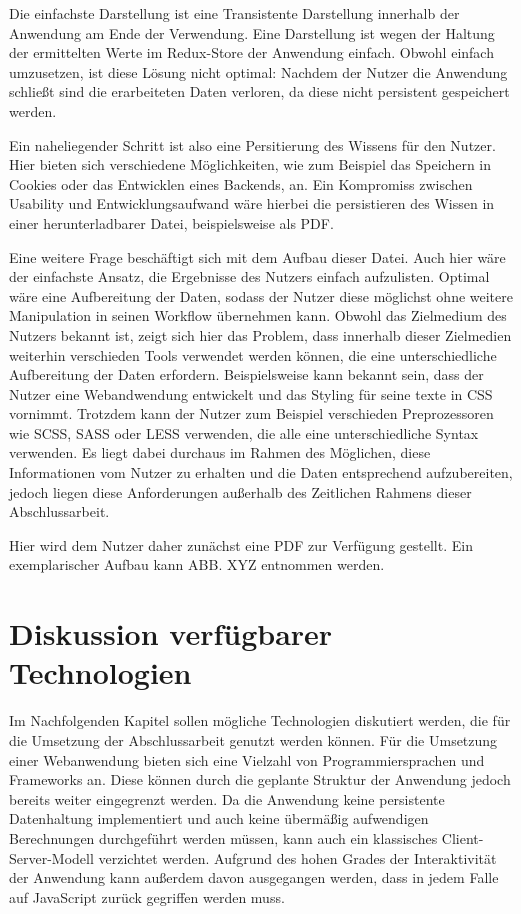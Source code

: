 Die einfachste Darstellung ist eine Transistente Darstellung innerhalb der Anwendung am Ende der Verwendung. Eine Darstellung ist wegen der Haltung der ermittelten Werte im Redux-Store der Anwendung einfach. Obwohl einfach umzusetzen, ist diese Lösung nicht optimal: Nachdem der Nutzer die Anwendung schließt sind die erarbeiteten Daten verloren, da diese nicht persistent gespeichert werden.

Ein naheliegender Schritt ist also eine Persitierung des Wissens für den Nutzer. Hier bieten sich verschiedene Möglichkeiten, wie zum Beispiel das Speichern in Cookies oder das Entwicklen eines Backends, an. Ein Kompromiss zwischen Usability und Entwicklungsaufwand wäre hierbei die persistieren des Wissen in einer herunterladbarer Datei, beispielsweise als PDF.

Eine weitere Frage beschäftigt sich mit dem Aufbau dieser Datei. Auch hier wäre der einfachste Ansatz, die Ergebnisse des Nutzers einfach aufzulisten. Optimal wäre eine Aufbereitung der Daten, sodass der Nutzer diese möglichst ohne weitere Manipulation in seinen Workflow übernehmen kann. Obwohl das Zielmedium des Nutzers bekannt ist, zeigt sich hier das Problem, dass innerhalb dieser Zielmedien weiterhin verschieden Tools verwendet werden können, die eine unterschiedliche Aufbereitung der Daten erfordern.
Beispielsweise kann bekannt sein, dass der Nutzer eine Webandwendung entwickelt und das Styling für seine texte in CSS vornimmt. Trotzdem kann der Nutzer zum Beispiel verschieden Preprozessoren wie SCSS, SASS oder LESS verwenden, die alle eine unterschiedliche Syntax verwenden.
Es liegt dabei durchaus im Rahmen des Möglichen, diese Informationen vom Nutzer zu erhalten und die Daten entsprechend aufzubereiten, jedoch liegen diese Anforderungen außerhalb des Zeitlichen Rahmens dieser Abschlussarbeit.

Hier wird dem Nutzer daher zunächst eine PDF zur Verfügung gestellt. Ein exemplarischer Aufbau kann ABB. XYZ entnommen werden.

\section{Diskussion verfügbarer Technologien}
Im Nachfolgenden Kapitel sollen mögliche Technologien diskutiert werden, die für die Umsetzung der Abschlussarbeit genutzt werden können. Für die Umsetzung einer Webanwendung bieten sich eine Vielzahl von Programmiersprachen und Frameworks an. Diese können durch die geplante Struktur der Anwendung jedoch bereits weiter eingegrenzt werden. Da die Anwendung keine persistente Datenhaltung implementiert und auch keine übermäßig aufwendigen Berechnungen durchgeführt werden müssen, kann auch ein klassisches Client-Server-Modell verzichtet werden.
Aufgrund des hohen Grades der Interaktivität der Anwendung kann außerdem davon ausgegangen werden, dass in jedem Falle auf JavaScript zurück gegriffen werden muss.

